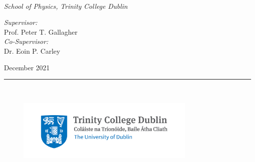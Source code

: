 \documentclass[a4paper,twoside,12pt,usenatbib]{Latex/Classes/PhDthesisPSnPDF}
\begin{document}
\vspace*{\fill}
\begin{flushright}
{ \\[1mm]
{\textnormal{\textit{School of Physics, Trinity College Dublin}}\\}

\vspace*{\fill}
\begin{flushright}
\textnormal{
\textit{Supervisor:} \\
Prof. Peter T. Gallagher}\\[0.5mm]
\textnormal{
\textit{Co-Supervisor:} \\
Dr. Eoin P. Carley}\\[0.5mm]
\end{flushright}
{December 2021}\\[5mm]
\rule{0.9\textwidth}{0.5mm}\\[4mm]
%
\begin{figure}[ht!]
\hspace{1mm}
\raggedleft
\includegraphics[height=30mm]{tcd_logo.png}
\end{figure}

%
}
\end{flushright}


\frontmatter







\setcounter{secnumdepth}{3} %
\setcounter{tocdepth}{3}    %
\tableofcontents            %



\listoffigures	%


\end{document}
